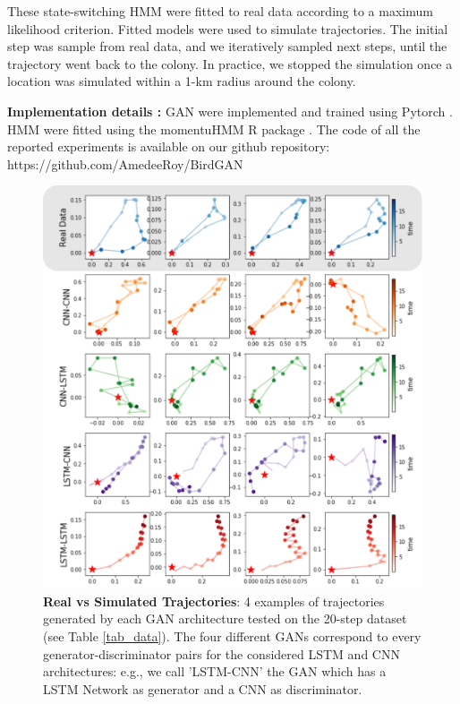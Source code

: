 \documentclass{article}
\begin{document}
These state-switching HMM were fitted to real data according to a maximum likelihood criterion. Fitted models were used to simulate trajectories. The initial step was sample from real data, and we iteratively sampled next steps, until the trajectory went back to the colony. In practice, we stopped the simulation once a location was simulated within a 1-km radius around the colony.

\textbf{Implementation details :}
GAN were implemented and trained using Pytorch \citep{paskze_pytorch_2019}. HMM were fitted using the momentuHMM R package \citep{mcclintock_momentuhmm_2018}. The code of all the reported experiments is available on our github repository: https://github.com/AmedeeRoy/BirdGAN

\begin{figure}[h]
  \centering
  \includegraphics[scale=0.5]{1_trajectory.png}
  \caption{\textbf{Real vs Simulated Trajectories}: 4 examples of trajectories generated by each GAN architecture tested on the 20-step dataset (see Table \ref{tab_data}). The four different GANs correspond to every generator-discriminator pairs for the considered LSTM and CNN architectures: e.g., we call 'LSTM-CNN' the GAN which has a LSTM Network as generator and a CNN as discriminator.}
  \label{1_trajectory}
\end{figure}
\end{document}
